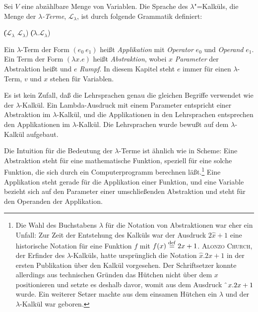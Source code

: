 \begin{definition}
  
  Sei $V$ eine abzählbare Menge von Variablen. 
  Die Sprache des $\lambda$"=Kalküls, die Menge der
  \textit{$\lambda$-Terme},
  $\mathcal{L}_{\lambda}$, ist
  durch folgende Grammatik definiert:
  \begin{grammar}
     \: 
    \> \| ($\mathcal{L}_{\lambda}$ $\mathcal{L}_{\lambda}$)
    \> \| ($\lambda$.$\mathcal{L}_{\lambda}$)
  \end{grammar}
%
Ein $\lambda$-Term der Form $(e_0~e_1)$ heißt 
\textit{Applikation} mit \textit{Operator} $e_0$ und \textit{Operand}
$e_1$.  Ein Term der Form $(\lambda x.e)$ heißt \textit{Abstraktion},
wobei $x$ \textit{Parameter} der Abstraktion heißt und $e$
\textit{Rumpf}.  In diesem Kapitel steht $e$ immer für
einen $\lambda$-Term, $v$ und $x$ stehen für Variablen.
\end{definition}
%
Es ist kein Zufall, daß die Lehrsprachen genau die gleichen Begriffe verwendet
wie der $\lambda$-Kalkül.  Ein Lambda-Ausdruck mit einem
Parameter entspricht einer Abstraktion im $\lambda$-Kalkül,
und die Applikationen in den Lehrsprachen entsprechen den Applikationen im
$\lambda$-Kalkül.  Die Lehrsprachen wurde bewußt auf dem
$\lambda$-Kalkül aufgebaut.

Die Intuition für die Bedeutung der $\lambda$-Terme ist ähnlich wie in
Scheme: Eine Abstraktion steht für eine mathematische Funktion,
speziell für eine solche Funktion, die sich durch ein Computerprogramm
berechnen läßt.\footnote{Die Wahl des Buchstabens $\lambda$ für die
  Notation von Abstraktionen war eher ein Unfall: Zur Zeit der
  Entstehung des Kalküls war der Ausdruck $2\hat{x}+1$ eine historische Notation für eine
  Funktion $f$ mit $f(x)\stackrel{\rm def}{=}{}2x+1$.  \textsc{Alonzo Church},
  der Erfinder des $\lambda$-Kalküls, hatte ursprünglich
  die Notation $\hat{x}.2x+1$ in der ersten Publikation über den
  Kalkül vorgesehen.  Der Schriftsetzer konnte allerdings aus
  technischen Gründen
  das Hütchen nicht über dem $x$ positionieren und setzte es deshalb
  davor, womit aus dem Ausdruck $\hat{~}\thinspace{}x.2x+1$ wurde.  Ein weiterer
  Setzer machte aus dem einsamen Hütchen ein $\lambda$ und der
  $\lambda$-Kalkül war geboren.}  Eine Applikation steht gerade für
die Applikation einer Funktion, und eine Variable bezieht sich auf den
Parameter einer umschließenden Abstraktion und steht für den Operanden
der Applikation.

